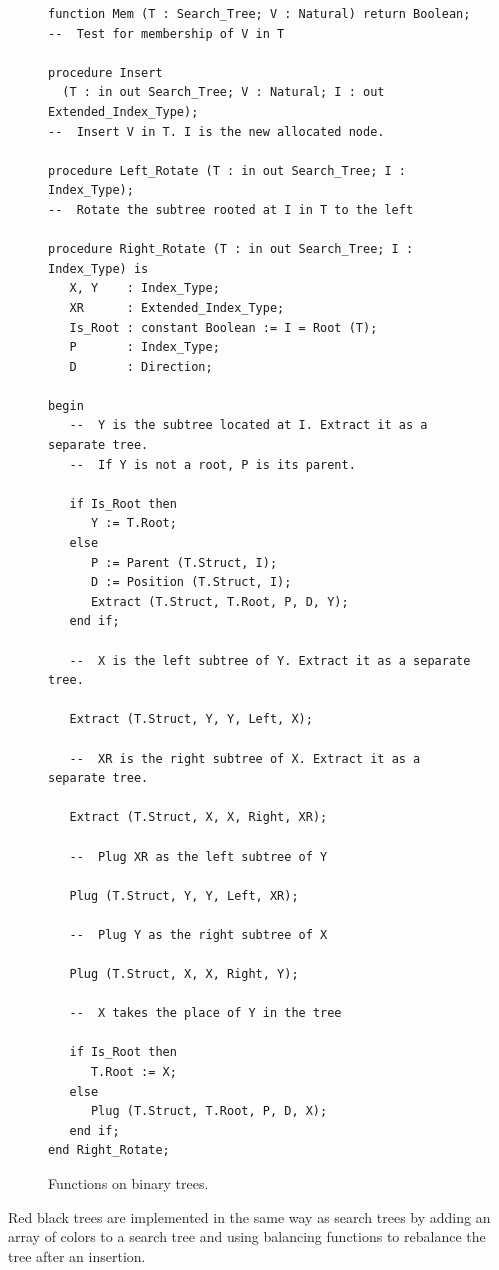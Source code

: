 \documentclass[11pt,a4paper]{article}
\begin{document}
\begin{figure}
\begin{small}
\begin{lstlisting}
function Mem (T : Search_Tree; V : Natural) return Boolean;
--  Test for membership of V in T

procedure Insert
  (T : in out Search_Tree; V : Natural; I : out Extended_Index_Type);
--  Insert V in T. I is the new allocated node.

procedure Left_Rotate (T : in out Search_Tree; I : Index_Type);
--  Rotate the subtree rooted at I in T to the left

procedure Right_Rotate (T : in out Search_Tree; I : Index_Type) is
   X, Y    : Index_Type;
   XR      : Extended_Index_Type;
   Is_Root : constant Boolean := I = Root (T);
   P       : Index_Type;
   D       : Direction;

begin
   --  Y is the subtree located at I. Extract it as a separate tree.
   --  If Y is not a root, P is its parent.

   if Is_Root then
      Y := T.Root;
   else
      P := Parent (T.Struct, I);
      D := Position (T.Struct, I);
      Extract (T.Struct, T.Root, P, D, Y);
   end if;

   --  X is the left subtree of Y. Extract it as a separate tree.

   Extract (T.Struct, Y, Y, Left, X);

   --  XR is the right subtree of X. Extract it as a separate tree.

   Extract (T.Struct, X, X, Right, XR);

   --  Plug XR as the left subtree of Y

   Plug (T.Struct, Y, Y, Left, XR);

   --  Plug Y as the right subtree of X

   Plug (T.Struct, X, X, Right, Y);

   --  X takes the place of Y in the tree

   if Is_Root then
      T.Root := X;
   else
      Plug (T.Struct, T.Root, P, D, X);
   end if;
end Right_Rotate;
\end{lstlisting}
\end{small}
\caption{\label{fig-search-fun} Functions on binary trees.}
\end{figure}

Red black trees are implemented in the same way as search trees by adding an array of
colors to a search tree and using balancing functions to rebalance the tree after an insertion.
\end{document}

